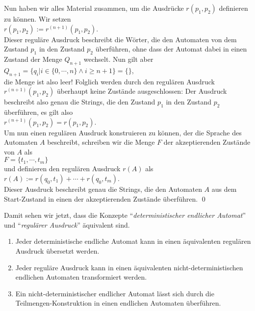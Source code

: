 Nun haben wir alles Material zusammen, um die Ausdr\"ucke $r(p_1,p_2)$ definieren zu k\"onnen.
Wir setzen 
\\[0.2cm]
\hspace*{1.3cm}
$r(p_1,p_2) := r^{(n+1)}(p_1,p_2)$. 
\\[0.2cm]
Dieser regul\"are Ausdruck beschreibt die W\"orter, die den Automaten von dem Zustand $p_1$ in
den Zustand $p_2$ \"uberf\"uhren, ohne dass der Automat dabei in einen Zustand der Menge
$Q_{n+1}$ wechselt.   Nun gilt aber
\\[0.2cm]
\hspace*{1.3cm}
$Q_{n+1} = \{ q_i | i \in \{0,\cdots,n \} \wedge i \geq n+1 \} = \{\}$,
\\[0.2cm]
die Menge ist also leer!  Folglich werden durch den regul\"aren Ausdruck $r^{(n+1)}(p_1,p_2)$
\"uberhaupt keine Zust\"ande ausgeschlossen:  Der Ausdruck beschreibt also genau die Strings,
die den Zustand $p_1$ in den Zustand $p_2$ \"uberf\"uhren, es gilt also
\\[0.2cm]
\hspace*{1.3cm}
$r^{(n+1)}(p_1,p_2) = r(p_1,p_2)$.
\\[0.2cm]
Um nun einen regul\"aren Ausdruck konstruieren zu k\"onnen, der die Sprache des Automaten $A$
beschreibt, schreiben wir die Menge $F$ der akzeptierenden Zust\"ande von $A$ als
\\[0.2cm]
\hspace*{1.3cm}
$F = \{ t_1, \cdots, t_m \}$
\\[0.2cm]
und definieren den regul\"aren Ausdruck $r(A)$ als
\\[0.2cm]
\hspace*{1.3cm}
$r(A) := r(q_0, t_1) + \cdots + r(q_0, t_m)$.
\\[0.2cm]
Dieser Ausdruck beschreibt genau die Strings, die den Automaten $A$ aus dem Start-Zustand
in einen der akzeptierenden Zust\"ande \"uberf\"uhren.
\qed
\vspace*{0.3cm}


\noindent
Damit sehen wir jetzt, dass die Konzepte ``\emph{deterministischer endlicher Automat}'' und
``\emph{regul\"arer Ausdruck}'' \"aquivalent sind.
\begin{enumerate}
\item Jeder deterministische endliche Automat kann in einen \"aquivalenten regul\"aren
      Ausdruck \"ubersetzt werden.
\item Jeder regul\"are Ausdruck kann in einen \"aquivalenten nicht-deterministischen endlichen Automaten
      transformiert werden.
\item Ein nicht-deterministischer endlicher Automat l\"asst sich durch die
      Teilmengen-Konstruktion in einen endlichen Automaten \"uberf\"uhren.
\end{enumerate}

